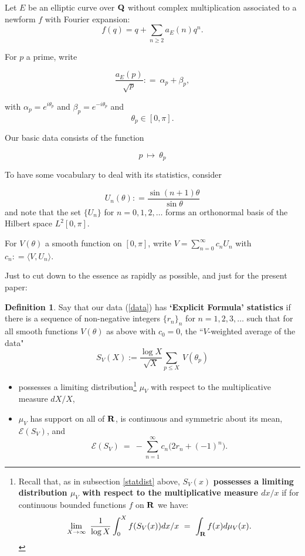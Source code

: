 \documentclass[11pt]{article}
\theoremstyle{plain}
\theoremstyle{definition}
\newtheorem{definition}[theorem]{Definition}
\numberwithin{equation}{section}
\numberwithin{figure}{section}
\numberwithin{table}{section}
\def\Q{\bf{Q}}
\begin{document}
Let $E$ be an elliptic curve over ${\Q}$ without complex multiplication associated to a newform $f$ with Fourier expansion:
$$f(q) = q+\sum_{n\ge 2}a_E(n)q^n.$$

For $p$ a prime, write

\begin{equation}
{\frac{a_E(p)}{\sqrt p}}: = \   \alpha_p+\beta_p,
\end{equation}

with $\alpha_p= e^{i\theta_p}$ and  $\beta_p= e^{-i\theta_p}$
and
\begin{equation}
  \theta_p \in [0, \pi].
\end{equation}


Our basic data consists of the function

\begin{equation}\label{data}
p \ \mapsto\ \theta_p
\end{equation}

To have some vocabulary to deal with its statistics, consider

$$U_n(\theta) : = {\frac {\sin(n+1)\theta}{\sin\theta}}$$ and note that the set $\{U_n\}$ for $n=0,1,2,\dots$ forms an orthonormal basis of the Hilbert space $L^2[0,\pi]$.

For $V(\theta)$ a smooth function on $[0,\pi]$, write $V=\sum_{n=0}^{\infty} c_nU_n$ with $c_n: = \langle V, U_n\rangle$.

Just to cut down to the essence as rapidly as possible, and just for the present paper:

\begin{definition} Say that our data (\ref{data}) has {\bf `Explicit Formula' statistics} if there is a sequence of non-negative integers $\{r_n\}_n$  for $n=1,2,3, \dots$ such that for all smooth functions $V(\theta)$ as above with $c_0=0$, the ``$V$-weighted average of the data"
\begin{equation}
S_V(X):= {\frac{\log X}{\sqrt X}}\sum_{p \le X} \ V(\theta_p)
\end{equation}
\begin{itemize}
\item
possesses a limiting distribution{\footnote{\label{footnote:statdist} Recall that, as in subsection    \ref{statdist} above,  $S_V(x)$ {\bf possesses a limiting distribution $\mu_V$ with respect to the multiplicative measure $dx/x$} if for continuous bounded functions $f$ on ${\bf R}$ we have:
\begin{equation}
\lim_{X \to {\infty}}\ {\frac{1}{\log X}}\int_0^Xf(S_V(x))dx/x \ = \ \int_{\bf R}f(x)d\mu_V(x).
\end{equation}}}
 $\mu_V$ with respect to the multiplicative measure $dX/X$,
\item  $\mu_V$ has support on all of ${\bf R}$, is continuous and symmetric about its mean, ${\mathcal E}(S_V)$, and
\begin{equation}\label{eqnmean}
{\mathcal E}(S_V)\ = \ -\sum_{n=1}^{\infty}  c_n\big(2r_n+(-1)^n\big).
\end{equation}
\end{itemize}
\end{definition}
\end{document}
